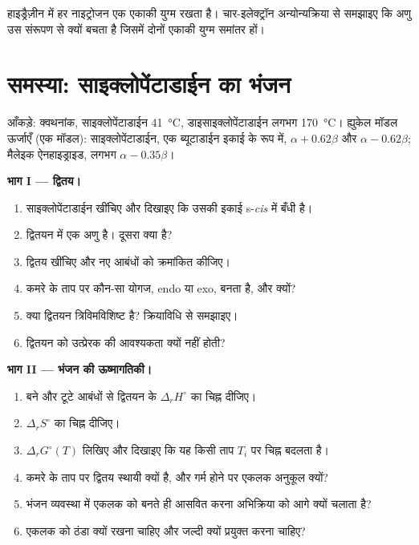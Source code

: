 \begin{exercise}[$\star\star\star$]\label{exo:b2:frontier-orbitals:12}
हाइड्रैज़ीन  में हर नाइट्रोजन एक एकाकी युग्म रखता है। चार-इलेक्ट्रॉन
अन्योन्यक्रिया से समझाइए कि अणु उस संरूपण से क्यों बचता है जिसमें दोनों एकाकी
युग्म समांतर हों।
\end{exercise}

\section{समस्या: साइक्लोपेंटाडाईन का भंजन}

\begin{problem}
\label{pb:b2:frontier-orbitals:1}
आँकड़े: क्वथनांक, साइक्लोपेंटाडाईन \qty{41}{\degreeCelsius}, डाइसाइक्लोपेंटाडाईन लगभग
\qty{170}{\degreeCelsius}। ह्युकेल मॉडल ऊर्जाएँ (एक मॉडल): साइक्लोपेंटाडाईन, एक
ब्यूटाडाईन इकाई के रूप में,  $\alpha + 0.62\beta$ और  $\alpha - 0.62\beta$; मैलेइक ऐनहाइड्राइड, 
लगभग $\alpha - 0.35\beta$।

\medskip
\noindent\textbf{भाग I --- द्वितय।}
\begin{enumerate}
  \item साइक्लोपेंटाडाईन खींचिए और दिखाइए कि उसकी  इकाई s-\textit{cis} में बँधी है।
  \item द्वितयन में एक अणु  है। दूसरा क्या है?
  \item द्वितय खींचिए और नए आबंधों को क्रमांकित कीजिए।
  \item कमरे के ताप पर कौन-सा योगज, endo या exo, बनता है, और क्यों?
  \item क्या द्वितयन त्रिविमविशिष्ट है? क्रियाविधि से समझाइए।
  \item द्वितयन को उत्प्रेरक की आवश्यकता क्यों नहीं होती?
\end{enumerate}

\medskip
\noindent\textbf{भाग II --- भंजन की ऊष्मागतिकी।}
\begin{enumerate}[resume]
  \item बने और टूटे आबंधों से द्वितयन के $\Delta_r H^\circ$ का चिह्न
        दीजिए।
  \item $\Delta_r S^\circ$ का चिह्न दीजिए।
  \item $\Delta_r G^\circ(T)$ लिखिए और दिखाइए कि यह किसी ताप $T_i$ पर चिह्न बदलता है।
  \item कमरे के ताप पर द्वितय स्थायी क्यों है, और गर्म होने पर एकलक अनुकूल क्यों?
  \item भंजन व्यवस्था में एकलक को बनते ही आसवित करना अभिक्रिया को आगे क्यों
        चलाता है?
  \item एकलक को ठंडा क्यों रखना चाहिए और जल्दी क्यों प्रयुक्त करना चाहिए?
\end{enumerate}


\end{problem}
